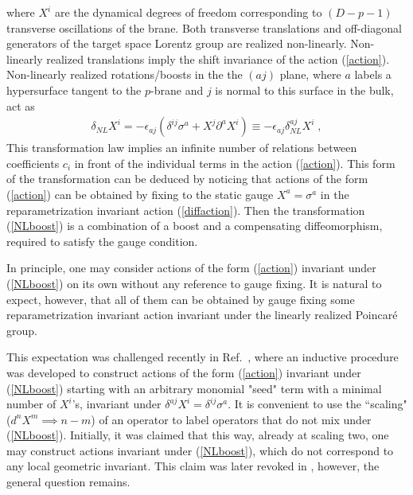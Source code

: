 \documentclass[%
 reprint,
 amsmath,amssymb,
 aps,
]{revtex4-1}
\begin{document}
where $X^i$ are the dynamical degrees of freedom  corresponding to  $(D-p-1)$ transverse oscillations
of the brane. Both transverse translations and off-diagonal generators of the target space
Lorentz group are realized non-linearly. Non-linearly realized translations imply the shift invariance of the action (\ref{action}).
 Non-linearly realized rotations/boosts in the
the $(aj)$ plane, where $a$ labels a hypersurface tangent to the $p$-brane and $j$ is normal to
this surface in the bulk, act as
\begin{eqnarray}
\label{NLboost}
\delta_{NL} X^i = - \epsilon_{a j} (\delta^{ij} \sigma^a + X^j \partial^a X^{i}) \equiv -\epsilon_{aj}\delta^{aj}_{NL} X^i \; ,
\end{eqnarray}
This transformation law implies an infinite number of relations between
coefficients $c_i$ in front of the individual terms in the action (\ref{action}). This form of the transformation can be deduced by noticing that actions
of the form (\ref{action}) can be obtained by fixing to the static gauge $X^a=\sigma^a$ in the reparametrization invariant action
(\ref{diffaction}). Then the transformation (\ref{NLboost}) is a combination of a boost and a compensating
diffeomorphism, required to satisfy the gauge condition.

In principle, one may consider actions of the form (\ref{action}) invariant under (\ref{NLboost}) on its own  without any reference to  gauge fixing.
It is natural to expect, however, that all of them can be obtained by gauge fixing some reparametrization invariant action
invariant under the linearly realized Poincar\'e group.

This expectation was challenged recently in Ref.~\cite{Gliozzi:2012cx}, where an inductive procedure was developed
to construct actions of the form (\ref{action}) invariant under (\ref{NLboost}) starting with an arbitrary monomial "seed" term with a minimal number of $X^i$'s, invariant under
$\delta^{aj}X^i= \delta^{ij}  \sigma^a $. It is convenient to use the ``scaling" ($d^n X^m \implies n-m$)
of an operator to label operators that do not mix under (\ref{NLboost}).
Initially, it was claimed that this way, already at scaling two, one may construct actions invariant under   (\ref{NLboost}), which do not correspond
to any local geometric invariant. This claim was later revoked in \cite{Meineri:2013ew}, however, the general question remains.
\end{document}
